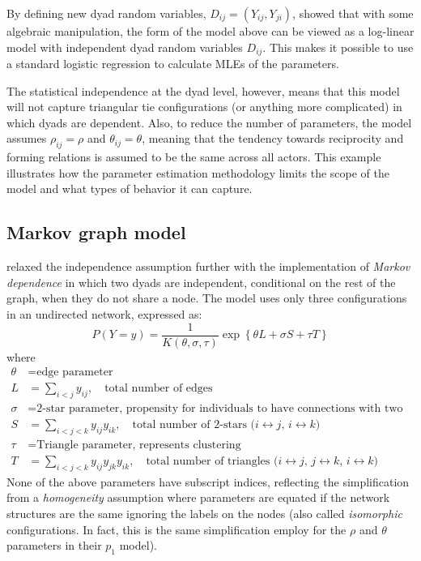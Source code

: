 By defining new dyad random variables, $D_{ij} = (Y_{ij}, Y_{ji} )$, \citeauthor
{Holland:1981}  showed that with some algebraic manipulation, the form of the model above 
can be viewed as a log-linear model with independent dyad random variables 
$D_{ij}$.  This makes it possible to use a standard logistic regression to calculate MLEs of the parameters.

The statistical independence at the dyad level, however, means that this model will 
not capture triangular tie configurations (or anything more complicated) in which dyads are dependent.  Also, to 
reduce the number of parameters, the model assumes $\rho_{ij} = \rho$ and $\theta_{ij} = \theta$, meaning that the 
tendency towards reciprocity and forming relations is assumed to be the same across all actors.  This example 
illustrates how the parameter estimation methodology limits the scope of the model and 
what types of behavior it can capture.  

\subsection{Markov graph model}
\citet{Frank:1986} relaxed the independence assumption further with the implementation 
of \textit{Markov dependence} in which two dyads are independent, conditional on the 
rest of the graph, when they do not share a node.  The model uses only three 
configurations in an undirected network, expressed as:
\[
	P( Y = y ) = \frac{1}{K( \theta, \sigma, \tau)}\exp 
				\left \{ \theta L + \sigma S + \tau T	\right \} 
	\]
where
\begin{align*}
	\theta &= \text{edge parameter} \\
	L &= \sum_{i < j} y_{ij}, \quad \text{total number of edges} \\
	\sigma &= \text{2-star parameter, propensity for individuals to have connections 
with two actors} \\
	S &= \sum_{i < j < k} y_{ij}y_{ik}, \quad \text{total number of 2-stars ($i \leftrightarrow j$, $i \leftrightarrow k$) }\\
	\tau	&= \text{Triangle parameter, represents clustering} \\
	T &= \sum_{i < j < k} y_{ij}y_{jk}y_{ik}, \quad \text{total number of triangles ($i \leftrightarrow j$, $j \leftrightarrow k$, $i 
\leftrightarrow k$)}
\end{align*}
None of the above parameters have subscript indices, reflecting the simplification 
from a \textit{homogeneity} assumption where parameters are equated if the 
network structures are the same ignoring the labels on the nodes (also called \textit
{isomorphic} configurations.  In fact, this is the same simplification \citeauthor{Holland:1981} employ for the $\rho$ and $\theta$ parameters in their $p_1$ model).

